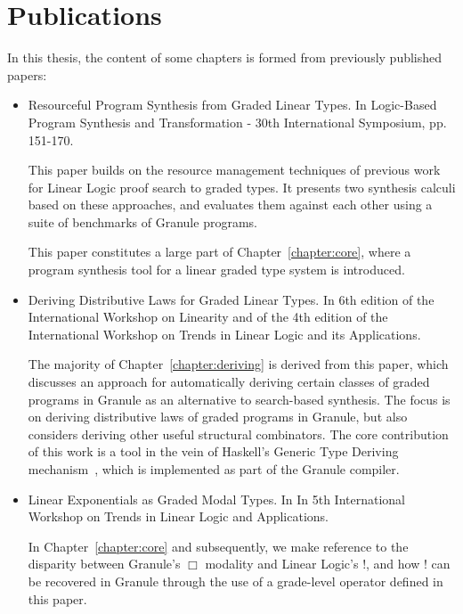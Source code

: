 \section{Publications}
In this thesis, the content of some chapters is formed from
previously published papers:
\begin{itemize}
    \item \citet{DBLP:conf/lopstr/HughesO20} Resourceful Program Synthesis from
    Graded Linear Types. In Logic-Based Program Synthesis and Transformation -
    30th International Symposium, pp. 151-170. 
    
    This paper builds on the resource management techniques of previous work for
    Linear Logic proof search to graded types. It presents two synthesis
    calculi based on these approaches, and evaluates them against each other 
    using a suite of benchmarks of Granule programs. 
    
    This paper constitutes a large part of Chapter~\ref{chapter:core}, where a
    program synthesis tool for a linear graded type system is introduced. 

    \item \citet{DBLP:journals/corr/abs-2112-14966} Deriving Distributive Laws
    for Graded Linear Types. In 6th edition of the International Workshop on
    Linearity and of the 4th edition of the International Workshop on Trends in
    Linear Logic and its Applications. 

    The majority of Chapter~\ref{chapter:deriving} is derived from this paper,
    which discusses an approach for automatically deriving certain classes of
    graded programs in Granule as an alternative to search-based synthesis. The
    focus is on deriving distributive laws of graded programs in Granule, but
    also considers deriving other useful structural combinators. The core
    contribution of this work is a tool in the vein of Haskell's Generic Type
    Deriving mechanism~\citep{generic-deriving}, which is implemented as part of
    the Granule compiler.

    \item \citet{hughes:lirmm-03271465} Linear Exponentials as Graded Modal
    Types. In In 5th International Workshop on Trends in Linear Logic and
    Applications.  

    In Chapter~\ref{chapter:core} and subsequently, we make reference to
    the disparity between Granule's $\Box$ modality and Linear Logic's !, and
    how ! can be recovered in Granule through the use of a grade-level operator
    defined in this paper.  
\end{itemize}
